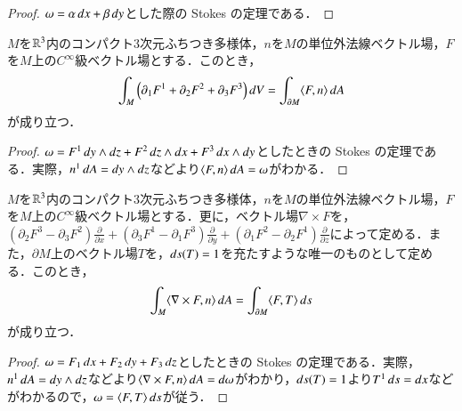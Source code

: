 \begin{proof}
$\omega = \alpha \mathop{}\!d x + \beta \mathop{}\!d y$とした際の Stokes の定理である．
\end{proof}

\begin{thm}[Gau\ss]
$M$を$\mathbb{R}^3$内のコンパクト3次元ふちつき多様体，$n$を$M$の単位外法線ベクトル場，$F$を$M$上の$C^\infty$級ベクトル場とする．このとき，
\begin{equation}
\int_M \left( \partial_1 F^1 + \partial_2 F^2 + \partial_3 F^3 \right) \mathop{}\!d V = \int_{\partial M} \langle F, n \rangle \mathop{}\!d A
\end{equation}が成り立つ．
\end{thm}

\begin{proof}
$\omega = F^1 \mathop{}\!d y \wedge \mathop{}\!d z + F^2 \mathop{}\!d z \wedge \mathop{}\!d x + F^3 \mathop{}\!d x \wedge \mathop{}\!d y$としたときの Stokes の定理である．実際，$n^1 \mathop{}\!d A = \mathop{}\!d y \wedge \mathop{}\!d z$などより$\langle F, n \rangle \mathop{}\!d A = \omega$がわかる．
\end{proof}

\begin{thm}
$M$を$\mathbb{R}^3$内のコンパクト3次元ふちつき多様体，$n$を$M$の単位外法線ベクトル場，$F$を$M$上の$C^\infty$級ベクトル場とする．更に，ベクトル場$\nabla \times F$を，$\left(\partial_2 F^3 - \partial_3 F^2\right) \frac{\partial}{\partial x} + \left(\partial_3 F^1 - \partial_1 F^3\right) \frac{\partial}{\partial y} + \left(\partial_1 F^2 - \partial_2 F^1\right) \frac{\partial}{\partial z}$によって定める．また，$\partial M$上のベクトル場$T$を，$\mathop{}\!d s (T) = 1$を充たすような唯一のものとして定める．このとき，
\begin{equation}
\int_M \langle \nabla \times F, n \rangle \mathop{}\!d A = \int_{\partial M} \langle F, T \rangle \mathop{}\!d s
\end{equation}が成り立つ．
\end{thm}

\begin{proof}
$\omega = F_1 \mathop{}\!d x + F_2 \mathop{}\!d y + F_3 \mathop{}\!d z$としたときの Stokes の定理である．実際，$n^1 \mathop{}\!d A = \mathop{}\!d y \wedge \mathop{}\!d z$などより$\langle \nabla \times F, n \rangle \mathop{}\!d A = \mathop{}\!d \omega$がわかり，$\mathop{}\!d s(T)=1$より$T^1 \mathop{}\!d s = \mathop{}\!d x$などがわかるので，$\omega = \langle F, T \rangle \mathop{}\!d s$が従う．
\end{proof}
